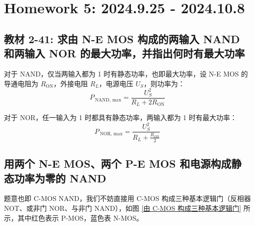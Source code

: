 \documentclass[UTF8]{report}
\theoremstyle{MyLineTheoremStyle} %
\theoremstyle{MyBlockTheoremStyle} %
\theoremstyle{MySubsubsectionStyle} %
\begin{document}
\chapter{Homework 5: 2024.9.25 - 2024.10.8}
\thispagestyle{fancy}

\section{教材 2-41: 求由 N-E MOS 构成的两输入 NAND 和两输入 NOR 的最大功率，并指出何时有最大功率}

对于 NAND，仅当两输入都为 1 时有静态功率，也即最大功率，设 N-E MOS 的导通电阻为 $R_{\text{ON}}$，外接电阻 $R_L$，电源电压 $U_S$，则功率为：
\begin{equation}
    P_{\,\text{NAND, max}} = \frac{U_S^2}{R_L + 2R_{\text{ON}}}
\end{equation}

对于 NOR，任一输入为 1 时都具有静态功率，两输入都为 1 时有最大功率：
\begin{equation}
    P_{\,\text{NOR, max}} = \frac{U_S^2}{R_L + \frac{R_{\text{ON}}}{2}}
\end{equation}

\section{用两个 N-E MOS、两个 P-E MOS 和电源构成静态功率为零的 NAND}

题意也即 C-MOS NAND，我们不妨直接用 C-MOS 构成三种基本逻辑门（反相器 NOT、或非门 NOR、与非门 NAND），如图 \ref{由 C-MOS 构成三种基本逻辑门} 所示，其中红色表示 P-MOS，蓝色表 N-MOS。
\end{document}
